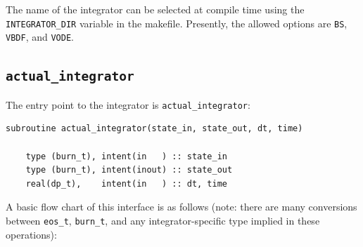 The name of the integrator can be selected at compile time using
the {\tt INTEGRATOR\_DIR} variable in the makefile.  Presently,
the allowed options are {\tt BS}, {\tt VBDF}, and {\tt VODE}.

\subsection{{\tt actual\_integrator}}

The entry point to the integrator is {\tt actual\_integrator}:
\begin{lstlisting}[language={[95]fortran}]
  subroutine actual_integrator(state_in, state_out, dt, time)

    type (burn_t), intent(in   ) :: state_in
    type (burn_t), intent(inout) :: state_out
    real(dp_t),    intent(in   ) :: dt, time
\end{lstlisting}
A basic flow chart of this interface is as follows (note: there are
many conversions between {\tt eos\_t}, {\tt burn\_t}, and any
integrator-specific type implied in these operations):
